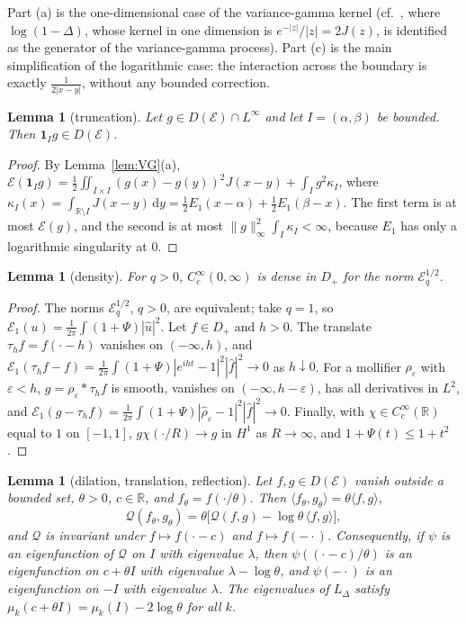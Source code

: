 \documentclass[11pt]{amsart}
\newcommand{\R}{\mathbb{R}}
\newcommand{\E}{\mathcal{E}}
\newcommand{\LD}{L_\Delta}
\newcommand{\eps}{\varepsilon}
\newcommand{\one}{\mathbf{1}}
\newcommand{\dd}{\,\mathrm{d}}
\newtheorem{lemma}[theorem]{Lemma}
\theoremstyle{definition}
\theoremstyle{remark}
\numberwithin{equation}{section}
\begin{document}
Part (a) is the one-dimensional case of the variance-gamma kernel (cf.~\cite{Feu23}, where $\log(1-\Delta)$, whose kernel in one dimension is $e^{-|z|}/|z|=2J(z)$, is identified as the generator of the variance-gamma process). Part (c) is the main simplification of the logarithmic case: the interaction across the boundary is exactly $\frac1{2|x-y|}$, without any bounded correction.

\begin{lemma}[truncation]\label{lem:trunc}
Let $g\in D(\E)\cap L^\infty$ and let $I=(\alpha,\beta)$ be bounded. Then $\one_Ig\in D(\E)$.
\end{lemma}

\begin{proof}
By Lemma~\ref{lem:VG}(a), $\E(\one_Ig)=\frac12\iint_{I\times I}(g(x)-g(y))^2J(x-y)+\int_Ig^2\kappa_I$, where $\kappa_I(x)=\int_{\R\setminus I}J(x-y)\dd y=\frac12E_1(x-\alpha)+\frac12E_1(\beta-x)$. The first term is at most $\E(g)$, and the second is at most $\|g\|_\infty^2\int_I\kappa_I<\infty$, because $E_1$ has only a logarithmic singularity at $0$.
\end{proof}

\begin{lemma}[density]\label{lem:density}
For $q>0$, $C_c^\infty(0,\infty)$ is dense in $D_+$ for the norm $\E_q^{1/2}$.
\end{lemma}

\begin{proof}
The norms $\E_q^{1/2}$, $q>0$, are equivalent; take $q=1$, so $\E_1(u)=\frac1{2\pi}\int(1+\Psi)|\hat u|^2$. Let $f\in D_+$ and $h>0$. The translate $\tau_hf=f(\cdot-h)$ vanishes on $(-\infty,h)$, and $\E_1(\tau_hf-f)=\frac1{2\pi}\int(1+\Psi)|e^{iht}-1|^2|\hat f|^2\to0$ as $h\downarrow0$. For a mollifier $\rho_\eps$ with $\eps<h$, $g=\rho_\eps*\tau_hf$ is smooth, vanishes on $(-\infty,h-\eps)$, has all derivatives in $L^2$, and $\E_1(g-\tau_hf)=\frac1{2\pi}\int(1+\Psi)|\hat\rho_\eps-1|^2|\hat f|^2\to0$. Finally, with $\chi\in C_c^\infty(\R)$ equal to $1$ on $[-1,1]$, $g\chi(\cdot/R)\to g$ in $H^1$ as $R\to\infty$, and $1+\Psi(t)\le1+t^2$.
\end{proof}

\begin{lemma}[dilation, translation, reflection]\label{lem:dilation}
Let $f,g\in D(\E)$ vanish outside a bounded set, $\theta>0$, $c\in\R$, and $f_\theta=f(\cdot/\theta)$. Then $\langle f_\theta,g_\theta\rangle=\theta\langle f,g\rangle$,
\[
\mathcal Q(f_\theta,g_\theta)=\theta\bigl[\mathcal Q(f,g)-\log\theta\,\langle f,g\rangle\bigr],
\]
and $\mathcal Q$ is invariant under $f\mapsto f(\cdot-c)$ and $f\mapsto f(-\cdot)$. Consequently, if $\psi$ is an eigenfunction of $\mathcal Q$ on $I$ with eigenvalue $\lambda$, then $\psi((\cdot-c)/\theta)$ is an eigenfunction on $c+\theta I$ with eigenvalue $\lambda-\log\theta$, and $\psi(-\cdot)$ is an eigenfunction on $-I$ with eigenvalue $\lambda$. The eigenvalues of $\LD$ satisfy $\mu_k(c+\theta I)=\mu_k(I)-2\log\theta$ for all $k$.
\end{lemma}
\end{document}
